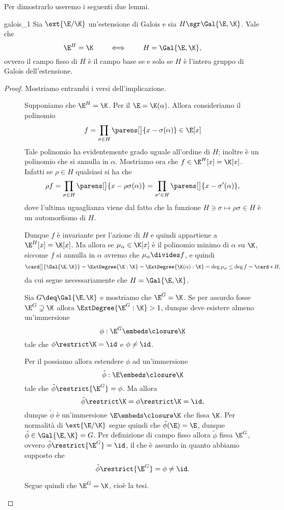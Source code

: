 Per dimostrarlo useremo i seguenti due lemmi.

\begin{lemma}
    {}{galois_1}
    Sia $\ext{\E / \K}$ un'estensione di Galois e sia $H \sgr \Gal{\E, \K}$. Vale che \begin{equation}
        \E^H = \K \qquad \iff \qquad H = \Gal{\E, \K},
    \end{equation} ovvero il campo fisso di $H$ è il campo base se e solo se $H$ è l'intero gruppo di Galois dell'estensione.
\end{lemma}
\begin{proof}
    Mostriamo entrambi i versi dell'implicazione.
    \begin{description}
        \item[\boximpl] Supponiamo che $\E^H = \K$. Per il  $\E = \K(\alpha)$. Allora consideriamo il polinomio \[
            f = \prod_{\sigma \in H} \parens[\big]{x - \sigma(\alpha)} \in \E[x]
        \] Tale polinomio ha evidentemente grado uguale all'ordine di $H$; inoltre è un polinomio che si annulla in $\alpha$. Mostriamo ora che $f \in \E^H[x] = \K[x]$. Infatti se $\rho \in H$ qualsiasi si ha che \[
            \rho f = \prod_{\sigma \in H} \parens[\big]{x - \rho\sigma(\alpha)} = \prod_{\sigma' \in H} \parens[\big]{x - \sigma'(\alpha)},
        \] dove l'ultima uguaglianza viene dal fatto che la funzione $H \ni \sigma \mapsto \rho\sigma \in H$ è un automorfismo di $H$.

        Dunque $f$ è invariante per l'azione di $H$ e quindi appartiene a $\E^H[x] = \K[x]$. Ma allora se $\mu_\alpha \in \K[x]$ è il polinomio minimo di $\alpha$ su $\K$, siccome $f$ si annulla in $\alpha$ avremo che $\mu_\alpha \divides f$, e quindi \[
            \card[\big]{\Gal{\E, \K}} = \ExtDegree{\E : \K} = \ExtDegree{\K(\alpha) : \K} = \deg \mu_\alpha \leq \deg f = \card*{H},
        \] da cui segue necessariamente che $H = \Gal{\E, \K}$.
        \item[\boximplby] Sia $G \deq \Gal{\E, \K}$ e mostriamo che $\E^G = \K$. Se per assurdo fosse $\E^G \supsetneq \K$ allora $\ExtDegree{\E^G : \K} > 1$, dunque deve esistere almeno un'immersione \[
            \phi : \E^G \embeds \closure\K
        \] tale che $\phi\restrict\K = \id$ e $\phi \neq \id$.
        
        Per il  possiamo allora estendere $\phi$ ad un'immersione \[
            \tilde\phi : \E \embeds \closure\K
        \] tale che $\tilde\phi\restrict{\E^G} = \phi$. Ma allora \[
            \tilde\phi\restrict\K = \phi\restrict\K = \id,
        \] dunque $\tilde\phi$ è un'immersione $\E \embeds \closure\K$ che fissa $\K$. Per normalità di $\ext{\E / \K}$ segue quindi che $\tilde\phi(\E) = \E$, dunque $\tilde\phi \in \Gal{\E, \K} = G$. Per definizione di campo fisso allora $\tilde\phi$ fissa $\E^G$, ovvero $\tilde\phi\restrict{\E^G} = \id$, il che è assurdo in quanto abbiamo supposto che \[
            \tilde\phi\restrict{\E^G} = \phi \neq \id.
        \]

        Segue quindi che $\E^G = \K$, cioè la tesi.
    \end{description}
\end{proof}

